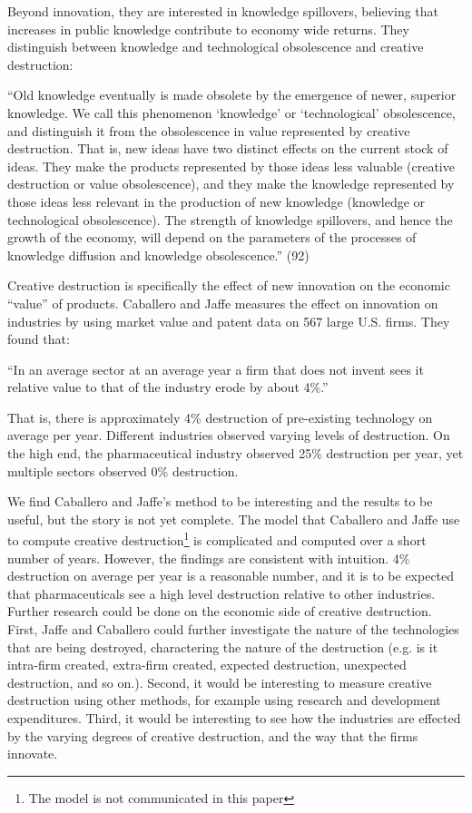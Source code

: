 \documentclass[11pt]{article}
\begin{document}
Beyond innovation, they are interested in knowledge spillovers, believing that increases in public knowledge contribute to economy wide returns.
They distinguish between knowledge and technological obsolescence and creative destruction:
\begin{displayquote}
``Old knowledge eventually is made obsolete by the emergence of newer, superior knowledge. We call this phenomenon `knowledge' or `technological' obsolescence, and distinguish it from the obsolescence in value represented by creative destruction.
That is, new ideas have two distinct effects on the current stock of ideas. 
They make the products represented by those ideas less valuable (creative destruction or value obsolescence), and they make the knowledge represented by those ideas less relevant in the production of new knowledge (knowledge or technological obsolescence). 
The strength of knowledge spillovers, and hence the growth of the economy, will depend on the parameters of the processes of knowledge diffusion and knowledge obsolescence.'' (92)
\end{displayquote}
Creative destruction is specifically the effect of new innovation on the economic ``value'' of products.
Caballero and Jaffe measures the effect on innovation on industries by using market value and patent data on 567 large U.S. firms.
They found that:
\begin{displayquote}
    ``In an average sector at an average year a firm that does not invent sees it relative value to that of the industry erode by about 4\%.''
\end{displayquote}
That is, there is approximately 4\% destruction of pre-existing technology on average per year. 
Different industries observed varying levels of destruction.
On the high end, the pharmaceutical industry observed 25\% destruction per year, yet multiple sectors observed 0\% destruction.

We find Caballero and Jaffe's method to be interesting and the results to be useful, but the story is not yet complete.
The model that Caballero and Jaffe use to compute creative destruction\footnote{The model is not communicated in this paper} is complicated and computed over a short number of years.
However, the findings are consistent with intuition.
4\% destruction on average per year is a reasonable number, and it is to be expected that pharmaceuticals see a high level destruction relative to other industries. 
Further research could be done on the economic side of creative destruction.
First, Jaffe and Caballero could further investigate the nature of the technologies that are being destroyed, charactering the nature of the destruction (e.g. is it intra-firm created, extra-firm created, expected destruction, unexpected destruction, and so on.).
Second, it would be interesting to measure creative destruction using other methods, for example using research and development expenditures.
Third, it would be interesting to see how the industries are effected by the varying degrees of creative destruction, and the way that the firms innovate.
\end{document}
